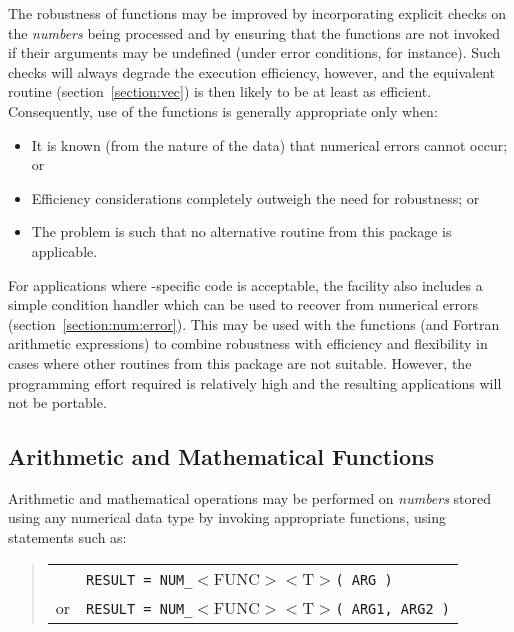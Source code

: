 The robustness of  functions may be improved by incorporating
explicit checks on the {\em numbers} being processed and by ensuring that
the functions are not invoked if their arguments may be undefined (under
error conditions, for instance). 
Such checks will always degrade the execution efficiency, however, and the
equivalent  routine (section~\ref{section:vec}) is then likely
to be at least as efficient. 
Consequently, use of the  functions is generally appropriate 
only when:

\begin{itemize}

\item It is known (from the nature of the data) that numerical errors cannot
occur; or

\item Efficiency considerations completely outweigh the need for robustness;
or

\item The problem is such that no alternative routine from this package
is applicable.

\end{itemize}

For applications where -specific code is acceptable, the
 facility also includes a simple  condition handler
which can be used to recover from numerical errors
(section~\ref{section:num:error}). 
This may be used with the  functions (and Fortran arithmetic
expressions) to combine robustness with efficiency and flexibility in cases
where other routines from this package are not suitable. 
However, the programming effort required is relatively high and the
resulting applications will not be portable. 

\subsection{ Arithmetic and Mathematical Functions}

Arithmetic and mathematical operations may be performed on {\em numbers}
stored using any numerical data type by invoking appropriate 
functions, using statements such as: 

\begin{quote}
\begin{tabular}{ll}
   & \verb#RESULT = NUM_#$<$FUNC$><$T$>$\verb#( ARG )#\\
or & \verb#RESULT = NUM_#$<$FUNC$><$T$>$\verb#( ARG1, ARG2 )#
\end{tabular}
\end{quote}

